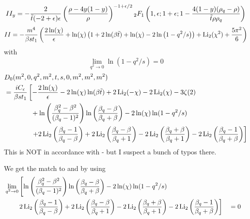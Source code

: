 \begin{equation}
II_y = -\frac {2}{\tilde t(-2+\epsilon)\epsilon}\left(\frac{\rho-4y(1-y)}{\rho}\right)^{-1+\epsilon/2}{}_{2}F_{1} \left(1,\epsilon;1+\epsilon;1-\frac{4(1-y)(\rho_q-\rho)}{\tilde t \rho\rho_q}\right)
\end{equation}
\begin{equation}
II = -\frac{m^4}{\beta s t_1}\left(\frac{2\ln(\chi)}{\epsilon} +  \ln(\chi)\left(1+2\ln(\beta \tilde t)+\ln(\chi)-2\ln\left(1-q^2/s\right)\right)+\operatorname{\text{Li}_2}(\chi^2)+\frac{5\pi^2}{6}\right)
\end{equation}
with
\begin{equation}
\lim_{q^2\rightarrow 0}\ln(1-q^2/s)=0
\end{equation}
\begin{align}
&D_0(m^2,0,q^2,m^2,t,s,0,m^2,m^2,m^2)\nonumber\\
 &=\frac{i C_\epsilon}{\beta s t_1}\left[-\frac{2\ln(\chi)}{\epsilon} -2\ln(\chi)\ln(\beta\tilde t)+2\operatorname{\text{Li}_2}(-\chi)-2\operatorname{\text{Li}_2}(\chi)-3\zeta(2) \right.\nonumber\\
 &\hspace{40pt}+\ln\left(\frac{\beta_q^2-\beta^2}{(\beta_q-1)^2}\right)\ln\left(\frac{\beta_q-\beta}{\beta_q+\beta}\right)-2\ln(\chi)\ln(1-q^2/s)\nonumber\\
 &\hspace{40pt}\left. + 2\operatorname{\text{Li}_2}\left(\frac{\beta_q-1}{\beta_q-\beta}\right)+2\operatorname{\text{Li}_2}\left(\frac{\beta_q-\beta}{\beta_q+1}\right)-2\operatorname{\text{Li}_2}\left(\frac{\beta_q+\beta}{\beta_q+1}\right)-2\operatorname{\text{Li}_2}\left(\frac{\beta_q-1}{\beta_q+\beta}\right) \right]
\end{align}
This is NOT in accordance with \cite[eq. (A.3)]{Laenen1993162} - but I suspect a bunch of typos there.

We get the match to \cite{Bojak:2000eu} and \cite{PhysRevD.40.54} by using
\begin{align}
&\lim_{q^2\rightarrow 0}\left[\ln\left(\frac{\beta_q^2-\beta^2}{(\beta_q-1)^2}\right)\ln\left(\frac{\beta_q-\beta}{\beta_q+\beta}\right)-2\ln(\chi)\ln(1-q^2/s)\right.\nonumber\\
&\hspace{20pt}\left. 2\operatorname{\text{Li}_2}\left(\frac{\beta_q-1}{\beta_q-\beta}\right)+2\operatorname{\text{Li}_2}\left(\frac{\beta_q-\beta}{\beta_q+1}\right)-2\operatorname{\text{Li}_2}\left(\frac{\beta_q+\beta}{\beta_q+1}\right)-2\operatorname{\text{Li}_2}\left(\frac{\beta_q-1}{\beta_q+\beta}\right) \right]&&=0
\end{align}

